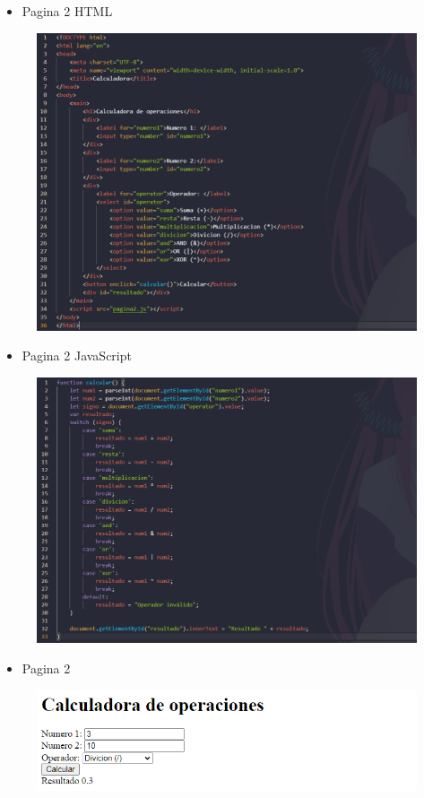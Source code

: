 \documentclass{article}
\begin{document}
	\clearpage
	\begin{itemize}
		\item Pagina 2 HTML
	\end{itemize}
	\begin{figure}[H]
		\centering
		\includegraphics[width=1.0\textwidth, keepaspectratio]{img/pagina2a}
	\end{figure}
	\begin{itemize}
		\item Pagina 2 JavaScript
	\end{itemize}
	\begin{figure}[H]
		\centering
		\includegraphics[width=1.0\textwidth, keepaspectratio]{img/pagina2b}
	\end{figure}
	\begin{itemize}
		\item Pagina 2
	\end{itemize}
	\begin{figure}[H]
		\centering
		\includegraphics[width=1.0\textwidth, keepaspectratio]{img/pagina2c}
	\end{figure}
	
\end{document}
